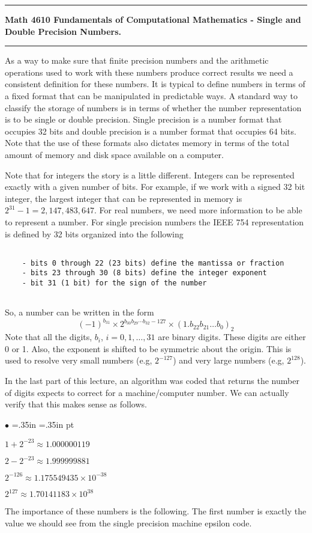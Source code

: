 \documentclass[10pt,fleqn]{article}
\begin{document}
\vskip0.1in\hrule\vskip0.1in
\noindent
{\bf Math 4610 Fundamentals of Computational Mathematics  -  Single and Double
 Precision Numbers.}
\vskip0.1in\hrule\vskip0.1in
\noindent
As a way to make sure that finite precision numbers and the arithmetic
operations used to work with these numbers produce correct results we need a
consistent definition for these numbers. It is typical to define numbers in
terms of a fixed format that can be manipulated in predictable ways. A standard
way to classify the storage of numbers is in terms of whether the number
representation is to be single or double precision. Single precision is a number
format that occupies 32 bits and double precision is a number format that
occupies 64 bits. Note that the use of these formats also dictates memory in
terms of the total amount of memory and disk space available on a computer.

Note that for integers the story is a little different. Integers can be
represented exactly with a given number of bits. For example, if we work with a
signed 32 bit integer, the largest integer that can be represented in memory is
$2^{31}-1=2,147,483,647$. For real numbers, we need more information to be able
to represent a number. For single precision numbers the IEEE 754 representation
is defined by 32 bits organized into the following
\begin{verbatim}

    - bits 0 through 22 (23 bits) define the mantissa or fraction
    - bits 23 through 30 (8 bits) define the integer exponent
    - bit 31 (1 bit) for the sign of the number
 
\end{verbatim}
So, a number can be written in the form
\[
  (-1)^{b_{31}} \times 2^{b_{30}b_{29}\cdots b_{32}-127}
     \times (1.b_{22}b_{21}\ldots b_{0})_2
\]
Note that all the digits, $b_i$, $i=0,1,\ldots,31$ are binary digits. These
digits are either 0 or 1. Also, the exponent is shifted to be symmetric about
the origin. This is used to resolve very small numbers (e.g, $2^{-127}$) and
very large numbers (e.g, $2^{128}$). 

In the last part of this lecture, an algorithm was coded that returns the number
of digits expects to correct for a machine/computer number. We can actually
verify that this makes sense as follows.
\begin{list}{$\bullet$}{ \parsep=0pt \listparindent=0pt
\topsep=0pt \rightmargin=.35in \leftmargin=.35in  pt
\itemsep=2pt}
  \item $1 + 2^{-23} \approx 1.000000119$
  \item $2 - 2^{-23} \approx 1.999999881$
  \item $2^{-126} \approx 1.175549435 \times 10^{-38}$
  \item $2^{127} \approx 1.70141183 \times 10^{38}$
\end{list}
The importance of these numbers is the following. The first number is exactly
the value we should see from the single precision machine epsilon code.
\end{document}
